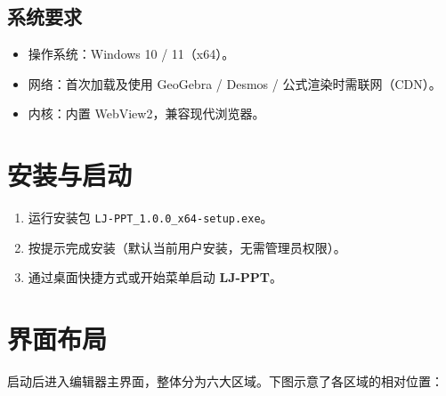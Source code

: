 \documentclass[12pt,a4paper]{ctexart}
\begin{document}
\subsection{系统要求}
\begin{itemize}
  \item 操作系统：Windows 10 / 11（x64）。
  \item 网络：首次加载及使用 GeoGebra / Desmos / 公式渲染时需联网（CDN）。
  \item 内核：内置 WebView2，兼容现代浏览器。
\end{itemize}

\section{安装与启动}
\begin{enumerate}
  \item 运行安装包 \texttt{LJ-PPT\_1.0.0\_x64-setup.exe}。
  \item 按提示完成安装（默认当前用户安装，无需管理员权限）。
  \item 通过桌面快捷方式或开始菜单启动 \textbf{LJ-PPT}。
\end{enumerate}

\section{界面布局}
启动后进入编辑器主界面，整体分为六大区域。下图示意了各区域的相对位置：
\end{document}

